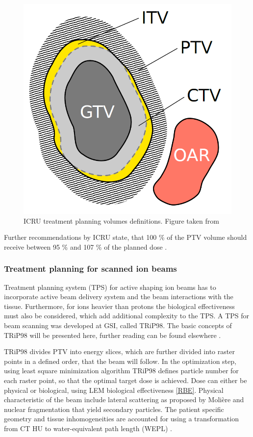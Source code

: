 \documentclass[type=dr, dr=rernat, accentcolor=tud7b,colorbacktitle, bigchapter, openright, twoside, 12pt ]{tudthesis}
\begin{document}
\begin{figure}[H]
\begin{center}
\includegraphics[scale=0.3]{./Images/volumes.png}
\caption{ICRU treatment planning volumes definitions. Figure taken from \cite{Richter2012}}
\end{center}
\end{figure}

Further recommendations by ICRU state, that 100 \% of the PTV volume should receive between 95 \% and 107 \% of the planned dose \cite{ICRU50}.


\subsubsection{Treatment planning for scanned ion beams}

Treatment planning system (TPS) for active shaping ion beams has to incorporate active beam delivery system and the beam interactions with the tissue. Furthermore, for ions heavier than protons
the biological effectiveness must also be considered, which add additional complexity to the TPS. A TPS for beam scanning was developed at GSI, called TRiP98. The basic concepts of TRiP98 will be
presented here, further reading can be found elsewhere \cite{Kraemer2000,Kraemer2000a}.

TRiP98 divides PTV into energy slices, which are further divided into raster points in a defined order, that the beam will follow. In the optimization step, using least square minimization
algorithm TRiP98 defines particle number for each raster point, so that the optimal target dose is achieved. Dose can either be physical or biological, using LEM biological effectiveness \ref{RBE}.
Physical characteristic of the beam include lateral scattering as proposed by Moli\`ere \cite{Moliere1948} and nuclear fragmentation that yield secondary particles. The patient specific
geometry and tissue inhomogeneities are accounted for using a transformation from CT HU to water-equivalent path length (WEPL) \cite{Geiss1999,Jaekel2001,Rietzel2007}.
\end{document}
